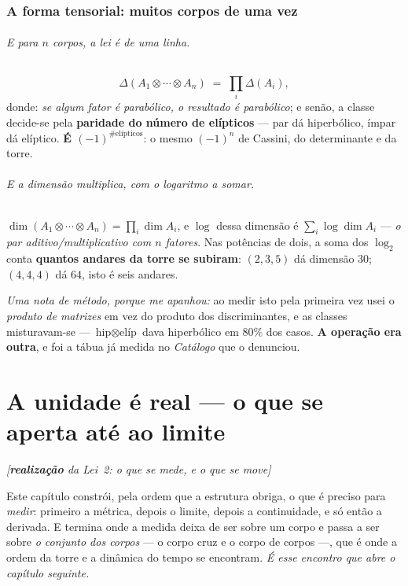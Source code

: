 \documentclass[livro.tex]{subfiles}
\begin{document}
\section{A forma tensorial: muitos corpos de uma vez}\label{sec:tensorial}

\paragraph{E para $n$ corpos, a lei é de uma linha.}
\[
  \Delta(A_1\otimes\cdots\otimes A_n) \;=\; \prod_i \Delta(A_i) ,
\]
donde: \emph{se algum fator é parabólico, o resultado é parabólico}; e senão, a classe decide-se
pela \textbf{paridade do número de elípticos} --- par dá hiperbólico, ímpar dá elíptico.
\textbf{É $(-1)^{\#\text{elípticos}}$}: o mesmo $(-1)^{n}$ de Cassini, do determinante e da torre.


\paragraph{E a dimensão multiplica, com o logaritmo a somar.}
$\dim(A_1\otimes\cdots\otimes A_n)=\prod_i\dim A_i$, e $\log$ dessa dimensão é
$\sum_i\log\dim A_i$ --- \emph{o par aditivo/multiplicativo com $n$ fatores}. Nas potências de dois,
a soma dos $\log_2$ conta \textbf{quantos andares da torre se subiram}: $(2,3,5)$ dá dimensão $30$;
$(4,4,4)$ dá $64$, isto é seis andares.

\medskip
\noindent \emph{Uma nota de método, porque me apanhou:} ao medir isto pela primeira vez usei o
\emph{produto de matrizes} em vez do produto dos discriminantes, e as classes misturavam-se ---
$\text{hip}\otimes\text{elíp}$ dava hiperbólico em $80\%$ dos casos. \textbf{A operação era outra}, e
foi a tábua já medida no \emph{Catálogo} que o denunciou.


\part{A unidade é real --- o que se aperta até ao limite}\label{part:analise}
\noindent\hfill\emph{\small[\textbf{realização} da Lei~2: o que se mede, e o que se move]}\medskip

\noindent Este capítulo constrói, pela ordem que a estrutura obriga, o que é preciso para
\emph{medir}: primeiro a métrica, depois o limite, depois a continuidade, e só então a derivada. E
termina onde a medida deixa de ser sobre um corpo e passa a ser sobre \emph{o conjunto dos corpos}
--- o corpo cruz e o corpo de corpos ---, que é onde a ordem da torre e a dinâmica do tempo se
encontram. \emph{É esse encontro que abre o capítulo seguinte.}
\end{document}

